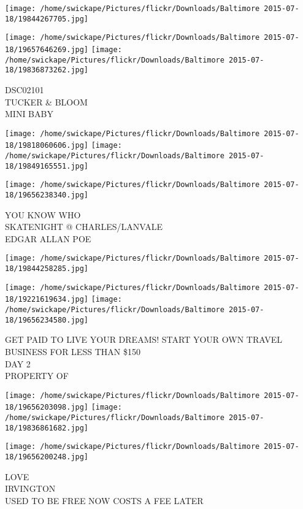 \documentclass[10pt,letterpaper]{article}
\begin{document}
\texttt{[image: /home/swickape/Pictures/flickr/Downloads/Baltimore 2015-07-18/19844267705.jpg]}

\vspace{0.25in}
\texttt{[image: /home/swickape/Pictures/flickr/Downloads/Baltimore 2015-07-18/19657646269.jpg]}
\texttt{[image: /home/swickape/Pictures/flickr/Downloads/Baltimore 2015-07-18/19836873262.jpg]}

DSC02101\\
TUCKER \& BLOOM\\
MINI BABY\\
\pagebreak

\texttt{[image: /home/swickape/Pictures/flickr/Downloads/Baltimore 2015-07-18/19818060606.jpg]}
\texttt{[image: /home/swickape/Pictures/flickr/Downloads/Baltimore 2015-07-18/19849165551.jpg]}

\texttt{[image: /home/swickape/Pictures/flickr/Downloads/Baltimore 2015-07-18/19656238340.jpg]}

YOU KNOW WHO\\
SKATENIGHT @ CHARLES/LANVALE\\
EDGAR ALLAN POE\\
\pagebreak

\texttt{[image: /home/swickape/Pictures/flickr/Downloads/Baltimore 2015-07-18/19844258285.jpg]}

\vspace{0.25in}
\texttt{[image: /home/swickape/Pictures/flickr/Downloads/Baltimore 2015-07-18/19221619634.jpg]}
\texttt{[image: /home/swickape/Pictures/flickr/Downloads/Baltimore 2015-07-18/19656234580.jpg]}

GET PAID TO LIVE YOUR DREAMS!  START YOUR OWN TRAVEL BUSINESS FOR LESS THAN \$150\\
DAY 2\\
PROPERTY OF\\
\pagebreak

\texttt{[image: /home/swickape/Pictures/flickr/Downloads/Baltimore 2015-07-18/19656203098.jpg]}
\texttt{[image: /home/swickape/Pictures/flickr/Downloads/Baltimore 2015-07-18/19836861682.jpg]}

\vspace{0.25in}
\texttt{[image: /home/swickape/Pictures/flickr/Downloads/Baltimore 2015-07-18/19656200248.jpg]}

LOVE\\
IRVINGTON\\
USED TO BE FREE NOW COSTS A FEE LATER\\
\pagebreak
\end{document}

